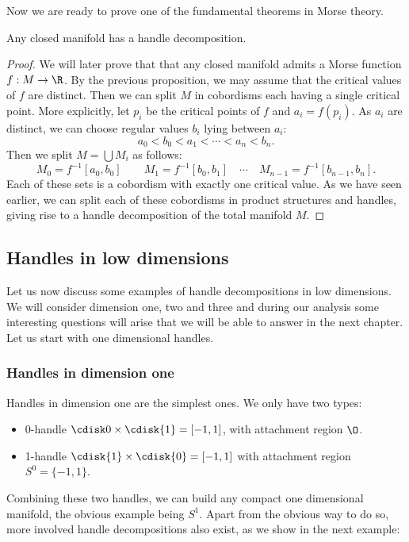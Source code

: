 Now we are ready to prove one of the fundamental theorems in Morse theory.

\begin{theorem}
    Any closed manifold has a handle decomposition.
\end{theorem}
\begin{proof}
    We will later prove that that any closed manifold admits a Morse function $f: M \to  \R$.
    By the previous proposition, we may assume that the critical values of $f$ are distinct.
    Then we can split $M$ in cobordisms each having a single critical point. 
    More explicitly, let $p_i$ be the critical points of  $f$ and  $a_i = f(p_i)$.
    As $a_i$ are distinct, we can choose regular values $b_i$ lying between $a_i$:
     \[
    a_0 < b_0 < a_1 < \cdots < a_n < b_n
    .\] 
    Then we split $M = \bigcup M_i$ as follows:
     \[
         M_0 = f^{-1}[a_0, b_0]\qquad
         M_1 = f^{-1}[b_0, b_1]\quad
         \cdots
         \quad
         M_{n-1} = f^{-1}[b_{n-1}, b_n]
    .\] 
    Each of these sets is a cobordism with exactly one critical value.
    As we have seen earlier, we can split each of these cobordisms in product structures and handles, giving rise to a handle decomposition of the total manifold $M$.
\end{proof}

\subsection*{Handles in low dimensions}

Let us now discuss some examples of handle decompositions in low dimensions.
We will consider dimension one, two and three and during our analysis some interesting questions will arise that we will be able to answer in the next chapter.
Let us start with one dimensional handles.


\newcommand\smallstrutt{\rule[-0.5cm]{0pt}{1.1cm}}
\subsubsection*{Handles in dimension one}
Handles in dimension one are the simplest ones.
We only have two types:

\begin{itemize}
    \item \smallstrutt 0-handle $\cdisk0 \times \cdisk{1} = [-1, 1]$, with attachment region $\O$. \hfill {} 
        
    \item \smallstrutt 1-handle   $\cdisk{1} \times  \cdisk{0} = [-1, 1]$ with attachment region $S^{0} = \{-1, 1\}$.  \hfill {}
\end{itemize}
Combining these two handles, we can build any compact one dimensional manifold, the obvious example being $S^{1}$. 
Apart from the obvious way to do so, more involved handle decompositions also exist, as we show in the next example:


